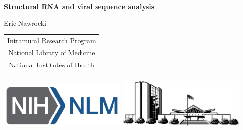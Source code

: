 \documentclass[landscape]{slides}
\begin{document}
\begin{slide}
\begin{center}
\large{\textbf{Structural RNA and viral sequence analysis}}

\normalsize

Eric Nawrocki \\

\medskip

\medskip

\medskip

\medskip

\medskip

\small
\begin{tabular}{c}
Intramural Research Program\\
National Library of Medicine\\
National Institutes of Health\\
\\
\end{tabular}

\vspace{0.1in}

\includegraphics[width=2.5in]{figs/NIH_NLM_ABRV_2C_4-white}
\includegraphics[width=2.5in]{figs/nlm-buildings}

\end{center}
\end{slide}
\end{document}

